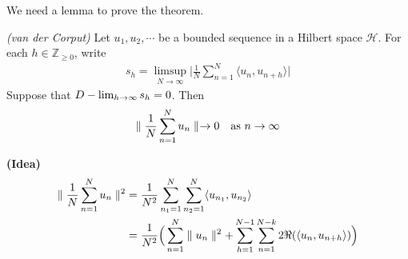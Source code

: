 \documentclass[10pt,a4paper]{report}
\newenvironment{proof}
{\begin{changemargin}{1cm}{0.5cm} 
	}%
	{\end{changemargin}
}
\begin{document}
We need a lemma to prove the theorem.
\s

\lem \emph{(van der Corput)} Let $u_1,u_2,\cdots$ be a bounded sequence in a Hilbert space $\mathscr{H}$. For each $h \in \mathbb{Z}_{\geq 0}$, write
\begin{align*}
s_h = \limsup_{N\rightarrow \infty} \Big| \frac{1}{N} \sum_{n=1}^N \langle u_n, u_{n+h} \rangle \Big|
\end{align*}
Suppose that $D-\lim_{h\rightarrow \infty} s_h =0$. Then
\begin{align*}
\parallel \frac{1}{N} \sum_{n=1}^N u_n \parallel_{} \rightarrow 0 \quad \text{as } n\rightarrow \infty
\end{align*}
\begin{proof}
\textbf{(Idea)}
\begin{align*}
\parallel \frac{1}{N}\sum_{n=1}^N u_n \parallel_{}^2 &= \frac{1}{N^2} \sum_{n_1=1}^N \sum_{n_2=1}^N \langle u_{n_1}, u_{n_2} \rangle \\
&= \frac{1}{N^2} \Big( \sum_{n=1}^N \parallel u_n \parallel_{}^2 + \sum_{h=1}^{N-1} \sum_{n=1}^{N-k} 2 \Re (\langle u_n, u_{n+h} \rangle ) \Big)
\end{align*}
\s


\end{proof}
\end{document}
